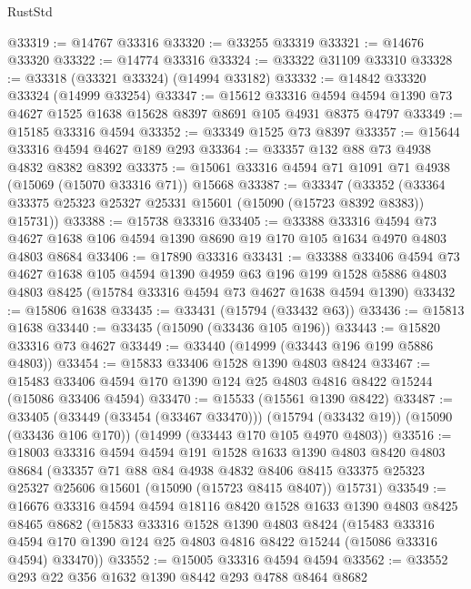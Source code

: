 \begin{lexlean}{RustStd}
\begin{coremodule}
@33319 := @14767 @33316
@33320 := @33255 @33319
@33321 := @14676 @33320
@33322 := @14774 @33316
@33324 := @33322 @31109 @33310
@33328 := @33318 (@33321 @33324) (@14994 @33182)
@33332 := @14842 @33320 @33324 (@14999 @33254)
@33347 := @15612
    @33316
    @4594
    @4594
    @1390
    @73
    @4627
    @1525
    @1638
    @15628
    @8397
    @8691
    @105
    @4931
    @8375
    @4797
@33349 := @15185 @33316 @4594
@33352 := @33349 @1525 @73 @8397
@33357 := @15644 @33316 @4594 @4627 @189 @293
@33364 := @33357 @132 @88 @73 @4938 @4832 @8382 @8392
@33375 := @15061 @33316 @4594 @71 @1091 @71 @4938 (@15069 (@15070 @33316 @71)) @15668
@33387 := @33347
    (@33352 (@33364 @33375 @25323 @25327 @25331 @15601 (@15090 (@15723 @8392 @8383)) @15731))
@33388 := @15738 @33316
@33405 := @33388
    @33316
    @4594
    @73
    @4627
    @1638
    @106
    @4594
    @1390
    @8690
    @19
    @170
    @105
    @1634
    @4970
    @4803
    @4803
    @8684
@33406 := @17890 @33316
@33431 := @33388
    @33406
    @4594
    @73
    @4627
    @1638
    @105
    @4594
    @1390
    @4959
    @63
    @196
    @199
    @1528
    @5886
    @4803
    @4803
    @8425
    (@15784 @33316 @4594 @73 @4627 @1638 @4594 @1390)
@33432 := @15806 @1638
@33435 := @33431 (@15794 (@33432 @63))
@33436 := @15813 @1638
@33440 := @33435 (@15090 (@33436 @105 @196))
@33443 := @15820 @33316 @73 @4627
@33449 := @33440 (@14999 (@33443 @196 @199 @5886 @4803))
@33454 := @15833 @33406 @1528 @1390 @4803 @8424
@33467 := @15483 @33406 @4594 @170 @1390 @124 @25 @4803 @4816 @8422 @15244 (@15086 @33406 @4594)
@33470 := @15533 (@15561 @1390 @8422)
@33487 := @33405
    (@33449 (@33454 (@33467 @33470)))
    (@15794 (@33432 @19))
    (@15090 (@33436 @106 @170))
    (@14999 (@33443 @170 @105 @4970 @4803))
@33516 := @18003
    @33316
    @4594
    @4594
    @191
    @1528
    @1633
    @1390
    @4803
    @8420
    @4803
    @8684
    (@33357
      @71
      @88
      @84
      @4938
      @4832
      @8406
      @8415
      @33375
      @25323
      @25327
      @25606
      @15601
      (@15090 (@15723 @8415 @8407))
      @15731)
@33549 := @16676
    @33316
    @4594
    @4594
    @18116
    @8420
    @1528
    @1633
    @1390
    @4803
    @8425
    @8465
    @8682
    (@15833
      @33316
      @1528
      @1390
      @4803
      @8424
      (@15483
        @33316
        @4594
        @170
        @1390
        @124
        @25
        @4803
        @4816
        @8422
        @15244
        (@15086 @33316 @4594)
        @33470))
@33552 := @15005 @33316 @4594 @4594
@33562 := @33552 @293 @22 @356 @1632 @1390 @8442 @293 @4788 @8464 @8682

\end{coremodule}
\end{lexlean}
